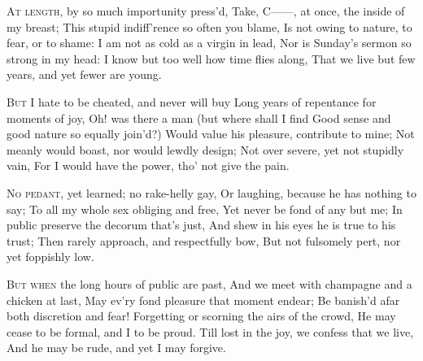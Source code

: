 \documentclass[fontsize=9, a5paper]{scrbook}
\begin{document}
\begin{poem}
	\begin{stanza}
		\textsc{At length,} by so much importunity press'd,\verseline
		Take, C——, at once, the inside of my breast;\verseline
		This stupid indiff'rence so often you blame,\verseline
		Is not owing to nature, to fear, or to shame:\verseline
		I am not as cold as a virgin in lead,\verseline
		Nor is Sunday's sermon so strong in my head:\verseline
		I know but too well how time flies along,\verseline
		That we live but few years, and yet fewer are young.
	\end{stanza}
	
	\begin{stanza}
		\textsc{But I} hate to be cheated, and never will buy\verseline
		Long years of repentance for moments of joy,\verseline
		Oh! was there a man (but where shall I find\verseline
		Good sense and good nature so equally join'd?)\verseline
		Would value his pleasure, contribute to mine;\verseline
		Not meanly would boast, nor would lewdly design;\verseline
		Not over severe, yet not stupidly vain,\verseline
		For I would have the power, tho' not give the pain.
	\end{stanza}
	
	\begin{stanza}
		\textsc{No pedant,} yet learned; no rake-helly gay,\verseline
		Or laughing, because he has nothing to say;\verseline
		To all my whole sex obliging and free,\verseline
		Yet never be fond of any but me;\verseline
		In public preserve the decorum that's just,\verseline
		And shew in his eyes he is true to his trust;\verseline
		Then rarely approach, and respectfully bow,\verseline
		But not fulsomely pert, nor yet foppishly low.
	\end{stanza}

	\pagebreak
	
	\begin{stanza}
		\textsc{But when} the long hours of public are past,\verseline
		And we meet with champagne and a chicken at last,\verseline
		May ev'ry fond pleasure that moment endear;\verseline
		Be banish'd afar both discretion and fear!\verseline
		Forgetting or scorning the airs of the crowd,\verseline
		He may cease to be formal, and I to be proud.\verseline
		Till lost in the joy, we confess that we live,\verseline
		And he may be rude, and yet I may forgive.
	\end{stanza}
	

\end{poem}
\end{document}
